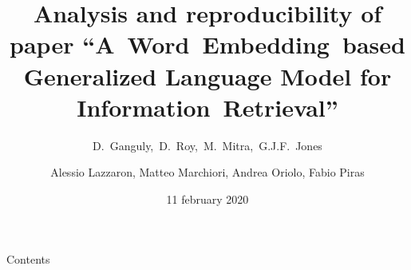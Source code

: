 \documentclass{beamer}
\title{Analysis and reproducibility of paper ``A~Word~Embedding~based Generalized Language Model for Information~Retrieval''}
\subtitle{D.~Ganguly,~D.~Roy,~M.~Mitra,~G.J.F.~Jones}
\author{Alessio Lazzaron, Matteo Marchiori, Andrea Oriolo, Fabio Piras}
\date{11 february 2020}
\begin{document}
\maketitle
\begin{frame}{Contents}
    \tableofcontents
\end{frame}




\end{document}
